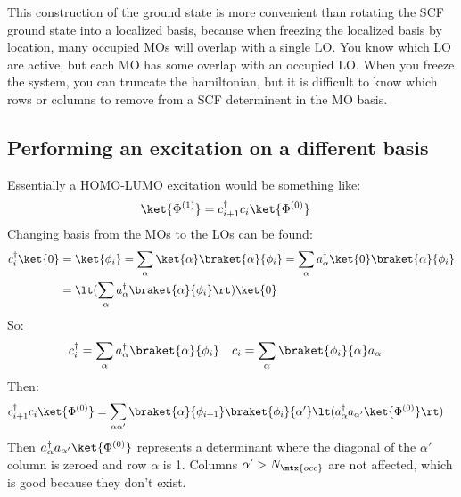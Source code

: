 \documentclass[10pt]{article}
\begin{document}
This construction of the ground state is more convenient than rotating the SCF ground state into a localized basis, because when freezing the localized basis by location, many occupied MOs will overlap with a single LO.
You know which LO are active, but each MO has some overlap with an occupied LO. 
When you freeze the system, you can truncate the hamiltonian, but it is difficult to know which rows or columns to remove from a SCF determinent in the MO basis. 

\subsection{Performing an excitation on a different basis}

Essentially a HOMO-LUMO excitation would be something like:
\begin{align}
  \ket{\Phi^{(1)}} 
  &=
  c_{i+1}^\dag c_i \ket{\Phi^{(0)}}
\end{align}
Changing basis from the MOs to the LOs can be found:
\begin{align}
  c_i^\dag \ket{0}
  &=
  \ket{\phi_i}
  =
  \sum_\alpha 
  \ket{\alpha} \braket{\alpha}{\phi_i}
  =
  \sum_\alpha 
  a_\alpha^\dag \ket{0} \braket{\alpha}{\phi_i}
  \\
  &=
  \lt(
    \sum_\alpha 
    a_\alpha^\dag \braket{\alpha}{\phi_i}
  \rt)
  \ket{0}
\end{align}
So:
\begin{align}
  & c_i^\dag = \sum_\alpha a_\alpha^\dag \braket{\alpha}{\phi_i} &
  & c_i = \sum_\alpha \braket{\phi_i}{\alpha} a_\alpha &
  \\
\end{align}
Then:
\begin{align}
  c_{i+1}^\dag c_i 
  \ket{\Phi^{(0)}}
  &=
  \sum_{\alpha \alpha'}
  \braket{\alpha}{\phi_{i+1}}
  \braket{\phi_i}{\alpha'}
  \lt(
    a_\alpha^\dag a_{\alpha'} \ket{\Phi^{(0)}}
  \rt)
\end{align}
Then $ a_\alpha^\dag a_{\alpha'} \ket{\Phi^{(0)}} $ represents a determinant where the diagonal of the $\alpha'$ column is zeroed and row $\alpha$ is 1.
Columns $\alpha' > N_\mtx{occ}$ are not affected, which is good because they don't exist.
\end{document}
